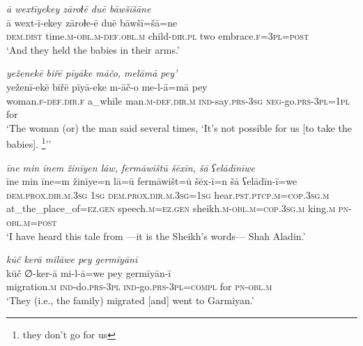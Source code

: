 \ea \label{ZB.32}
\textit{ā wextīyekey zāroɫē duē bāwšīšāne} \\ 
\gll ā wext-ī-ekey zāroɫe-ē duē bāwšī=šā=ne \\ 
 \textsc{dem.dist} time\textsc{.m}\textsc{-obl}\textsc{.m}\textsc{-def}\textsc{.obl}\textsc{.m} child\textsc{-dir}\textsc{.pl} two embrace\textsc{.f}\textsc{=3pl}\textsc{=\textsc{post}} \\ 
\glt `And they held the babies in their arms.'
\z 
 
\ea \label{ZB.33}
\textit{yeženekē biřē pīyāke māčo, melāmā pey’} \\ 
\gll yeženī-ekē biřē pīyā-eke m-āč-o me-l-ā=mā pey \\ 
 woman\textsc{.f}\textsc{-def}\textsc{.dir}\textsc{.f} a\_while man\textsc{.m}\textsc{-def}\textsc{.dir}\textsc{.m} \textsc{ind-}say\textsc{.prs}\textsc{-3sg} \textsc{neg-}go\textsc{.prs}\textsc{-3pl}\textsc{=1pl} for \\ 
\glt `The woman (or) the man said several times, ‘It's not possible for us [to take the babies]. \footnote{they don't go for us}’'
\z 
 
\ea \label{ZB.37}
\textit{īne min īnem žinīyen lāw, fermāwištū šēxīn, šā ʕelādīnīwe} \\ 
\gll īne min īne=m žinīye=n lā=ū fermāwišt=ū šēx-ī=n šā ʕelādīn-ī=we \\ 
 \textsc{dem.prox}\textsc{.dir}\textsc{.m}\textsc{.3sg} \textsc{1sg} \textsc{dem.prox}\textsc{.dir}\textsc{.m}\textsc{.3sg}\textsc{=\textsc{1sg}} hear\textsc{.pst}\textsc{.ptcp}\textsc{.m}\textsc{=cop}\textsc{.3sg}\textsc{.m} at\_the\_place\_of\textsc{\textsc{=ez.gen}} speech\textsc{.m}\textsc{\textsc{=ez.gen}} sheikh\textsc{.m}\textsc{-obl}\textsc{.m}\textsc{=cop}\textsc{.3sg}\textsc{.m} king\textsc{.m} \textsc{pn}\textsc{-obl}\textsc{.m}\textsc{=\textsc{post}} \\ 
\glt `I have heard this tale from —it is the Sheikh’s words— Shah Aladin.'
\z 
 
\ea \label{ZB.39}
\textit{kūč kerā milāwe pey germīyānī} \\ 
\gll kūč ∅-ker-ā mi-l-ā=we pey germīyān-ī \\ 
 migration\textsc{.m} \textsc{ind-}do\textsc{.prs}\textsc{-3pl} \textsc{ind-}go\textsc{.prs}\textsc{-3pl}\textsc{=compl} for \textsc{pn}\textsc{-obl}\textsc{.m} \\ 
\glt `They (i.e., the family) migrated [and] went to Garmiyan.'
\z 
 
